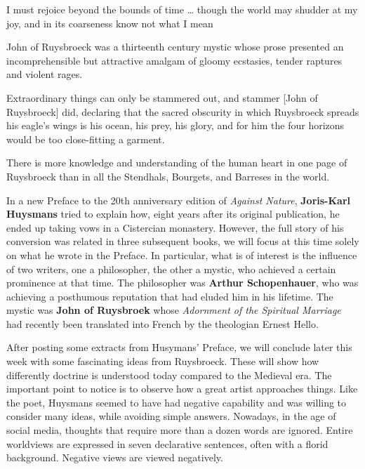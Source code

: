\begin{quotex}
I must rejoice beyond the bounds of time … though the world may shudder at my joy, and in its coarseness know not what I mean 

John of Ruysbroeck was a thirteenth century mystic whose prose presented an incomprehensible but attractive amalgam of gloomy ecstasies, tender raptures and violent rages. 

Extraordinary things can only be stammered out, and stammer [John of Ruysbroeck] did, declaring that the sacred obscurity in which Ruysbroeck spreads his eagle's wings is his ocean, his prey, his glory, and for him the four horizons would be too close-fitting a garment. 

There is more knowledge and understanding of the human heart in one page of Ruysbroeck than in all the Stendhals, Bourgets, and Barreses in the world. 

\end{quotex}
In a new Preface to the 20th anniversary edition of \emph{Against Nature}, \textbf{Joris-Karl Huysmans} tried to explain how, eight years after its original publication, he ended up taking vows in a Cistercian monastery. However, the full story of his conversion was related in three subsequent books, we will focus at this time solely on what he wrote in the Preface. In particular, what is of interest is the influence of two writers, one a philosopher, the other a mystic, who achieved a certain prominence at that time. The philosopher was \textbf{Arthur Schopenhauer}, who was achieving a posthumous reputation that had eluded him in his lifetime. The mystic was \textbf{John of Ruysbroek} whose \emph{Adornment of the Spiritual Marriage} had recently been translated into French by the theologian Ernest Hello.

After posting some extracts from Husymans' Preface, we will conclude later this week with some fascinating ideas from Ruysbroeck. These will show how differently doctrine is understood today compared to the Medieval era. The important point to notice is to observe how a great artist approaches things. Like the poet, Huysmans seemed to have had negative capability and was willing to consider many ideas, while avoiding simple answers. Nowadays, in the age of social media, thoughts that require more than a dozen words are ignored. Entire worldviews are expressed in seven declarative sentences, often with a florid background. Negative views are viewed negatively.

